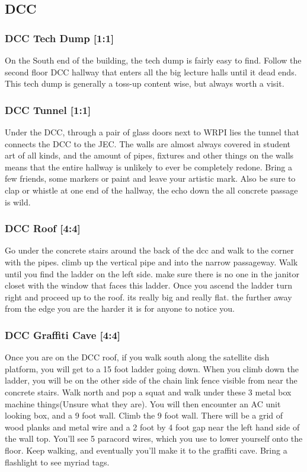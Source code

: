\documentclass{article}
\begin{document}
\pagebreak
\subsection{DCC}
\subsubsection{DCC Tech Dump [1:1]}
On the South end of the building, the tech dump is fairly easy to find. Follow the second floor DCC hallway that enters all the big lecture halls until it dead ends. This tech dump is generally a toss-up content wise, but always worth a visit.
\subsubsection{DCC Tunnel [1:1]}
Under the DCC, through a pair of glass doors next to WRPI lies the tunnel that connects the DCC to the JEC. The walls are almost always covered in student art of all kinds, and the amount of pipes, fixtures and other things on the walls means that the entire hallway is unlikely to ever be completely redone. Bring a few friends, some markers or paint and leave your artistic mark. Also be sure to clap or whistle at one end of the hallway, the echo down the all concrete passage is wild.

 \subsubsection{DCC Roof [4:4]}
Go under the concrete stairs around the back of the dcc and walk to the corner with the pipes. climb up the vertical pipe and into the narrow passageway. Walk until you find the ladder on the left side. make sure there is no one in the janitor closet with the window that faces this ladder. Once you ascend the ladder turn right and proceed up to the roof. its really big and really flat. the further away from the edge you are the harder it is for anyone to notice you.
\subsubsection{DCC Graffiti Cave [4:4]}
Once you are on the DCC roof, if you walk south along the satellite dish platform, you will get to a 15 foot ladder going down. When you climb down the ladder, you will be on the other side of the chain link fence visible from near the concrete stairs. Walk north and pop a squat and walk under these 3 metal box machine things(Unsure what they are). You will then encounter an AC unit looking box, and a 9 foot wall. Climb the 9 foot wall. There will be a grid of wood planks and metal wire and a 2 foot by 4 foot gap near the left hand side of the wall top. You’ll see 5 paracord wires, which you use to lower yourself onto the floor. Keep walking, and eventually you’ll make it to the graffiti cave. Bring a flashlight to see myriad tags.
\end{document}

